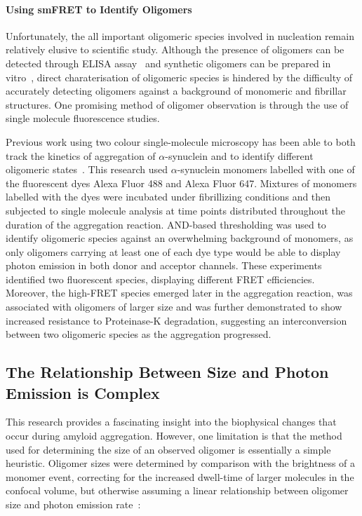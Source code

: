 \paragraph{Using smFRET to Identify Oligomers}
Unfortunately, the all important oligomeric species involved in nucleation remain relatively elusive to scientific study. Although the presence of oligomers can be detected through ELISA assay~\cite{Schmidt2005} and synthetic oligomers can be prepared in vitro~\cite{Lashuel2002, Murray2003}, direct charaterisation of oligomeric species is hindered by the difficulty of accurately detecting oligomers against a background of monomeric and fibrillar structures. One promising method of oligomer observation is through the use of single molecule fluorescence studies.

Previous work using two colour single-molecule microscopy has been able to both track the kinetics of aggregation of $\alpha$-synuclein and to identify different oligomeric states~\cite{orte08, cremades2012}. This research used $\alpha$-synuclein monomers labelled with one of the fluorescent dyes Alexa Fluor 488 and Alexa Fluor 647. Mixtures of monomers labelled with the dyes were incubated under fibrillizing conditions and then subjected to single molecule analysis at time points distributed throughout the duration of the aggregation reaction. AND-based thresholding was used to identify oligomeric species against an overwhelming background of monomers, as only oligomers carrying at least one of each dye type would be able to display photon emission in both donor and acceptor channels. These experiments identified two fluorescent species, displaying different FRET efficiencies. Moreover, the high-FRET species emerged later in the aggregation reaction, was associated with oligomers of larger size and was further demonstrated to show increased resistance to Proteinase-K degradation, suggesting an interconversion between two oligomeric species as the aggregation progressed.

\subsection{The Relationship Between Size and Photon Emission is Complex}


This research provides a fascinating insight into the biophysical changes that occur during amyloid aggregation. However, one limitation is that the method used for determining the size of an observed oligomer is essentially a simple heuristic. Oligomer sizes were determined by comparison with the brightness of a monomer event, correcting for the increased dwell-time of larger molecules in the confocal volume, but otherwise assuming a linear relationship between oligomer size and photon emission rate~\cite{orte08}:

